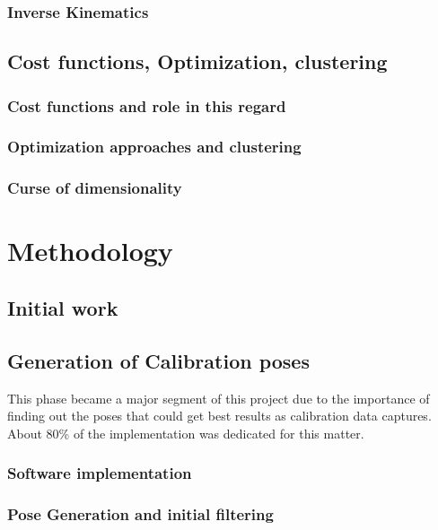 \documentclass[english, printversion, nomenclature, notitle]{tuvisionthesis} %
\begin{document}
\subsection{Inverse Kinematics}

\section{Cost functions, Optimization, clustering}
\subsection{Cost functions and role in this regard}
\subsection{Optimization approaches and clustering}
\subsection{Curse of dimensionality}

\chapter{Methodology}

\section{Initial work}
\section{Generation of Calibration poses}
This phase became a major segment of this project due to the importance of finding out the poses that could get best results as calibration data captures. About 80\% of the implementation was dedicated for this matter.

\subsection{Software implementation}
\subsection{Pose Generation and initial filtering}
\end{document}
